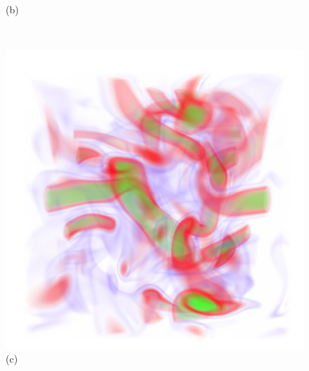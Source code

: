\documentclass[twoside,twocolumn,10pt]{article}
\begin{document}
\begin{figure}
\begin{minipage}{.16\textwidth}
		(b)
	\end{minipage}~
	\begin{minipage}{.16\textwidth}
		\centering
		\includegraphics[width=1\linewidth]{crop/vortex_merged_segment_green_red_purple}
		(c)
	\end{minipage}
	\begin{minipage}{.16\textwidth}
		\centering

\end{minipage}
\end{figure}
\end{document}
